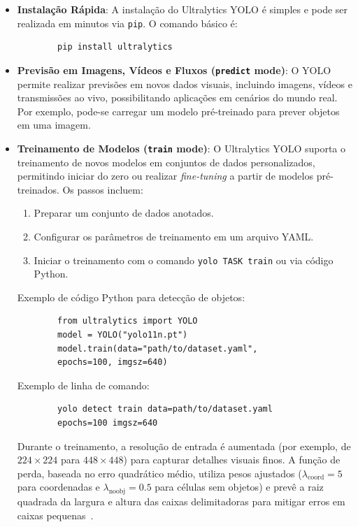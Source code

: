\documentclass[journal,transmag]{IEEEtran}
\begin{document}
\begin{itemize}
	\item \textbf{Instalação Rápida}: A instalação do Ultralytics YOLO é simples e pode ser realizada em minutos via \texttt{pip}. O comando básico é:
	\begin{verbatim}
		pip install ultralytics
	\end{verbatim}
	
	\item \textbf{Previsão em Imagens, Vídeos e Fluxos (\texttt{predict} mode)}: O YOLO permite realizar previsões em novos dados visuais, incluindo imagens, vídeos e transmissões ao vivo, possibilitando aplicações em cenários do mundo real. Por exemplo, pode-se carregar um modelo pré-treinado para prever objetos em uma imagem.
	
	\item \textbf{Treinamento de Modelos (\texttt{train} mode)}: O Ultralytics YOLO suporta o treinamento de novos modelos em conjuntos de dados personalizados, permitindo iniciar do zero ou realizar \textit{fine-tuning} a partir de modelos pré-treinados. Os passos incluem:
	\begin{enumerate}
		\item Preparar um conjunto de dados anotados.
		\item Configurar os parâmetros de treinamento em um arquivo YAML.
		\item Iniciar o treinamento com o comando \texttt{yolo TASK train} ou via código Python.
	\end{enumerate}
	Exemplo de código Python para detecção de objetos:
	\begin{verbatim}
		from ultralytics import YOLO
		model = YOLO("yolo11n.pt") 
		model.train(data="path/to/dataset.yaml",
		epochs=100, imgsz=640)
	\end{verbatim}
	Exemplo de linha de comando:
	\begin{verbatim}
		yolo detect train data=path/to/dataset.yaml 
		epochs=100 imgsz=640
	\end{verbatim}
	Durante o treinamento, a resolução de entrada é aumentada (por exemplo, de \( 224 \times 224 \) para \( 448 \times 448 \)) para capturar detalhes visuais finos. A função de perda, baseada no erro quadrático médio, utiliza pesos ajustados (\( \lambda_{\text{coord}} = 5 \) para coordenadas e \( \lambda_{\text{noobj}} = 0.5 \) para células sem objetos) e prevê a raiz quadrada da largura e altura das caixas delimitadoras para mitigar erros em caixas pequenas~\cite{Redmon2015}.
	

\end{itemize}
\end{document}
